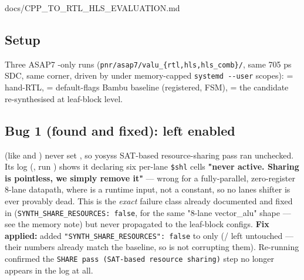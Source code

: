 \begin{relocated}{docs/CPP_TO_RTL_HLS_EVALUATION.md}
\subsection{Setup}\label{tm:dec:cpp-to-rtl-hls-evaluation:setup}

Three ASAP7 -only runs
(\texttt{pnr/\allowbreak{}asap7/\allowbreak{}valu\_\allowbreak{}\{rtl,\allowbreak{}hls,\allowbreak{}hls\_\allowbreak{}comb\}/\allowbreak{}},
same 705 ps SDC, same corner, driven by
 under memory-capped
\texttt{systemd\ -\allowbreak{}-\allowbreak{}user} scopes):  =
hand-RTL,  = default-flags Bambu baseline (registered, FSM),
 = the  candidate re-synthesised at
leaf-block level.

\subsection{\texorpdfstring{Bug 1 (found and fixed):
 left
enabled}{Bug 1 (found and fixed):  left enabled}}\label{tm:dec:cpp-to-rtl-hls-evaluation:bug-1-found-and-fixed-synth-share-resources-left-enabled}

 (like  and
) never set , so
yosys\textquotesingle s SAT-based  resource-sharing pass ran
unchecked. Its log (, run
) shows it declaring six per-lane
\texttt{\$shl} cells \textbf{"never active. Sharing is pointless, we
simply remove it"} --- wrong for a fully-parallel, zero-register 8-lane
datapath, where  is a runtime input, not a constant,
so no lane\textquotesingle s shifter is ever provably dead. This is the
\emph{exact} failure class already documented and fixed in
(\texttt{SYNTH\_\allowbreak{}SHARE\_\allowbreak{}RESOURCES:\allowbreak{}\ false},
for the same "8-lane vector\_\allowbreak{}alu" shape --- see the
 memory note) but never propagated
to the leaf-block configs. \textbf{Fix applied:} added
\texttt{"SYNTH\_\allowbreak{}SHARE\_\allowbreak{}RESOURCES":\allowbreak{}\ false}
to  only
(/ left untouched --- their numbers
already match the  baseline, so  is not corrupting
them). Re-running confirmed the
\texttt{SHARE\ pass\ (SAT-\allowbreak{}based\ resource\ sharing)} step
no longer appears in the log at all.


\end{relocated}
